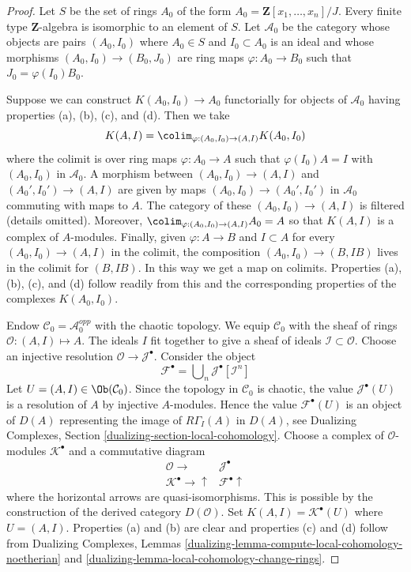 \begin{proof}
Let $S$ be the set of rings $A_0$ of the form
$A_0 = \mathbf{Z}[x_1, \ldots, x_n]/J$.
Every finite type $\mathbf{Z}$-algebra is isomorphic to
an element of $S$. Let $\mathcal{A}_0$ be the category whose objects
are pairs $(A_0, I_0)$ where $A_0 \in S$ and $I_0 \subset A_0$
is an ideal and whose morphisms $(A_0, I_0) \to (B_0, J_0)$ are
ring maps $\varphi : A_0 \to B_0$ such that $J_0 = \varphi(I_0)B_0$.

\medskip\noindent
Suppose we can construct $K(A_0, I_0) \to A_0$ functorially for
objects of $\mathcal{A}_0$ having properties (a), (b), (c), and (d).
Then we take
$$
K(A, I) = \colim_{\varphi : (A_0, I_0) \to (A, I)} K(A_0, I_0)
$$
where the colimit is over ring maps $\varphi : A_0 \to A$ such
that $\varphi(I_0)A = I$ with $(A_0, I_0)$ in $\mathcal{A}_0$.
A morphism between $(A_0, I_0) \to (A, I)$ and $(A_0', I_0') \to (A, I)$
are given by maps $(A_0, I_0) \to (A_0', I_0')$ in $\mathcal{A}_0$
commuting with maps to $A$.
The category of these $(A_0, I_0) \to (A, I)$ is filtered
(details omitted). Moreover, $\colim_{\varphi : (A_0, I_0) \to (A, I)} A_0 = A$
so that $K(A, I)$ is a complex of $A$-modules.
Finally, given $\varphi : A \to B$ and $I \subset A$
for every $(A_0, I_0) \to (A, I)$ in the colimit, the composition
$(A_0, I_0) \to (B, IB)$ lives in the colimit for $(B, IB)$.
In this way we get a map on colimits. Properties (a), (b), (c), and (d)
follow readily from this and the corresponding
properties of the complexes $K(A_0, I_0)$.

\medskip\noindent
Endow $\mathcal{C}_0 = \mathcal{A}_0^{opp}$ with the chaotic topology.
We equip $\mathcal{C}_0$ with the sheaf of rings
$\mathcal{O} : (A, I) \mapsto A$. The ideals $I$ fit together to give a
sheaf of ideals $\mathcal{I} \subset \mathcal{O}$.
Choose an injective resolution $\mathcal{O} \to \mathcal{J}^\bullet$.
Consider the object
$$
\mathcal{F}^\bullet = \bigcup\nolimits_n \mathcal{J}^\bullet[\mathcal{I}^n]
$$
Let $U = (A, I) \in \Ob(\mathcal{C}_0)$.
Since the topology in $\mathcal{C}_0$ is chaotic, the value
$\mathcal{J}^\bullet(U)$ is a resolution of $A$ by injective
$A$-modules. Hence the value $\mathcal{F}^\bullet(U)$ is an
object of $D(A)$ representing the image of $R\Gamma_I(A)$ in $D(A)$, see
Dualizing Complexes, Section \ref{dualizing-section-local-cohomology}.
Choose a complex of $\mathcal{O}$-modules $\mathcal{K}^\bullet$
and a commutative diagram
$$
\begin{array}{cc}\mathcal{O} \longrightarrow & \mathcal{J}^\bullet \\ \mathcal{K}^\bullet \longrightarrow\uparrow & \mathcal{F}^\bullet \uparrow\end{array}
$$
where the horizontal arrows are quasi-isomorphisms. This is possible
by the construction of the derived category $D(\mathcal{O})$.
Set $K(A, I) = \mathcal{K}^\bullet(U)$ where $U = (A, I)$.
Properties (a) and (b) are clear and properties (c) and (d)
follow from Dualizing Complexes, Lemmas
\ref{dualizing-lemma-compute-local-cohomology-noetherian} and
\ref{dualizing-lemma-local-cohomology-change-rings}.
\end{proof}

